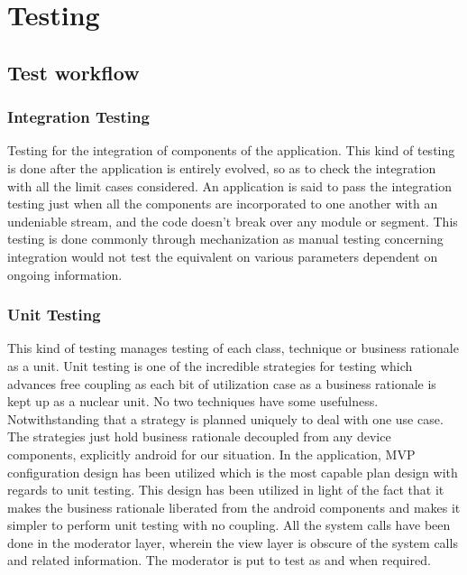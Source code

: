 \documentclass[oneside,12pt]{Classes/VTU}
\begin{document}
	
	\chapter{Testing}
	
	\section{Test workflow}
	\subsection{Integration Testing}
	Testing for the integration of components of the application. This kind of testing is done after the application is entirely evolved, so as to check the integration with all the limit cases considered. An application is said to pass the integration testing just when all the components are incorporated to one another with an undeniable stream, and the code doesn't break over any module or segment. This testing is done commonly through mechanization as manual testing concerning integration would not test the equivalent on various parameters dependent on ongoing information.

	\subsection{Unit Testing}
	This kind of testing manages testing of each class, technique or business rationale as a unit. Unit testing is one of the incredible strategies for testing which advances free coupling as each bit of utilization case as a business rationale is kept up as a nuclear unit. No two techniques have some usefulness. Notwithstanding that a strategy is planned uniquely to deal with one use case. The strategies just hold business rationale decoupled from any device components, explicitly android for our situation. In the application, MVP configuration design has been utilized which is the most capable plan design with regards to unit testing. This design has been utilized in light of the fact that it makes the business rationale liberated from the android components and makes it simpler to perform unit testing with no coupling. All the system calls have been done in the moderator layer, wherein the view layer is obscure of the system calls and related information. The moderator is put to test as and when required.
	
\end{document}
